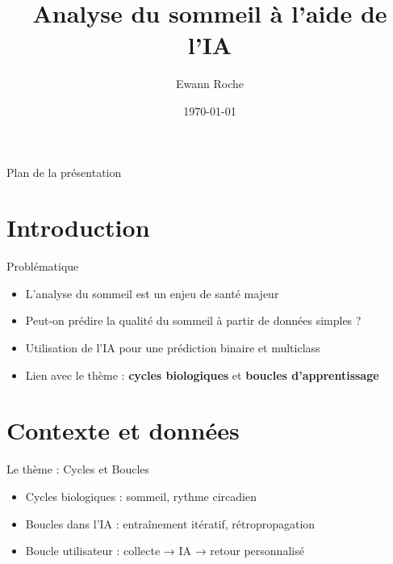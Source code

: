 \documentclass{beamer}
\title[TIPE - Cycles et Boucles]{Analyse du sommeil à l'aide de l'IA}
\author{Ewann Roche}
\date{\today}
\begin{document}
{
  \begin{frame}
    \titlepage
  \end{frame}
}

\begin{frame}[plain]{Plan de la présentation}
  \tableofcontents
\end{frame}


\section{Introduction}

\begin{frame}{Problématique}
  \begin{itemize}
    \item L'analyse du sommeil est un enjeu de santé majeur
    \item Peut-on prédire la qualité du sommeil à partir de données simples ?
    \item Utilisation de l'IA pour une prédiction binaire et multiclass
    \item Lien avec le thème : \textbf{cycles biologiques} et \textbf{boucles d'apprentissage}
  \end{itemize}
\end{frame}

\section{Contexte et données}

\begin{frame}{Le thème : Cycles et Boucles}
  \begin{itemize}
    \item Cycles biologiques : sommeil, rythme circadien
    \item Boucles dans l'IA : entraînement itératif, rétropropagation
    \item Boucle utilisateur : collecte → IA → retour personnalisé
  \end{itemize}
\end{frame}
\end{document}
